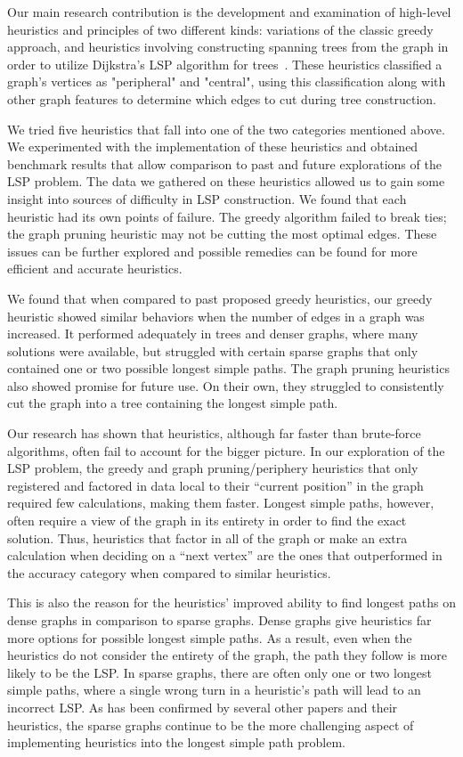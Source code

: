 \documentclass[twocolumn,showpacs,%
  nofootinbib,aps,superscriptaddress,%
  eqsecnum,prd,notitlepage,showkeys,11pt]{article}
\begin{document}
Our main research contribution is the development and examination of high-level heuristics and principles of two different kinds: variations of the classic greedy approach, and heuristics involving constructing spanning trees from the graph in order to utilize Dijkstra's LSP algorithm for trees~\cite{club2002computing}. These heuristics classified a graph's vertices as "peripheral" and "central", using this classification along with other graph features to determine which edges to cut during tree construction.

We tried five heuristics that fall into one of the two categories mentioned above. We experimented with the implementation of these heuristics and obtained benchmark results that allow comparison to past and future explorations of the LSP problem. The data we gathered on these heuristics allowed us to gain some insight into sources of difficulty in LSP construction. We found that each heuristic had its own points of failure. The greedy algorithm failed to break ties; the graph pruning heuristic may not be cutting the most optimal edges. These issues can be further explored and possible remedies can be found for more efficient and accurate heuristics.

We found that when compared to past proposed greedy heuristics, our greedy heuristic showed similar behaviors when the number of edges in a graph was increased. It performed adequately in trees and denser graphs, where many solutions were available, but struggled with certain sparse graphs that only contained one or two possible longest simple paths. The graph pruning heuristics also showed promise for future use. On their own, they struggled to consistently cut the graph into a tree containing the longest simple path. 

Our research has shown that heuristics, although far faster than brute-force algorithms, often fail to account for the bigger picture. In our exploration of the LSP problem, the greedy and graph pruning/periphery heuristics that only registered and factored in data local to their ``current position'' in the graph required few calculations, making them faster. Longest simple paths, however, often require a view of the graph in its entirety in order to find the exact solution. Thus, heuristics that factor in all of the graph or make an extra calculation when deciding on a ``next vertex'' are the ones that outperformed in the accuracy category when compared to similar heuristics.

This is also the reason for the heuristics' improved ability to find longest paths on dense graphs in comparison to sparse graphs. Dense graphs give heuristics far more options for possible longest simple paths. As a result, even when the heuristics do not consider the entirety of the graph, the path they follow is more likely to be the LSP. In sparse graphs, there are often only one or two longest simple paths, where a single wrong turn in a heuristic's path will lead to an incorrect LSP. As has been confirmed by several other papers and their heuristics, the sparse graphs continue to be the more challenging aspect of implementing heuristics into the longest simple path problem.
\end{document}
